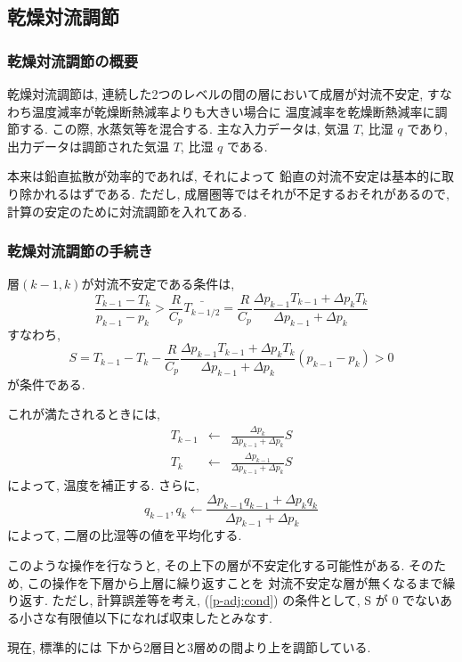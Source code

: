 ﻿
\subsection{乾燥対流調節}

\subsubsection{乾燥対流調節の概要}

乾燥対流調節は, 
連続した2つのレベルの間の層において成層が対流不安定, 
すなわち温度減率が乾燥断熱減率よりも大きい場合に
温度減率を乾燥断熱減率に調節する. この際, 水蒸気等を混合する.
主な入力データは, 気温 $T$, 比湿 $q$ であり,
出力データは調節された気温 $T$, 比湿 $q$ である.

本来は鉛直拡散が効率的であれば, それによって
鉛直の対流不安定は基本的に取り除かれるはずである.
ただし, 成層圏等ではそれが不足するおそれがあるので,
計算の安定のために対流調節を入れてある.

\subsubsection{乾燥対流調節の手続き}

層$(k-1,k)$が対流不安定である条件は,
%
\begin{equation}
\frac{T_{k-1} - T_{k}}{p_{k-1} - p_{k}} 
  > \frac{R}{C_p} \bar{T_{k-1/2}}
  = \frac{R}{C_p}
    \frac{\Delta p_{k-1} T_{k-1} + \Delta p_{k} T_{k}}
         {\Delta p_{k-1} + \Delta p_{k}} 
\end{equation}
%
すなわち,
\begin{equation}
 S = T_{k-1} - T_{k}
     - \frac{R}{C_p} 
        \frac{\Delta p_{k-1} T_{k-1} + \Delta p_{k} T_{k}}
         {\Delta p_{k-1} + \Delta p_{k}} 
       (p_{k-1} - p_{k})
   > 0 
  \label{p-adj:cond}
\end{equation}
が条件である.

これが満たされるときには,
\begin{eqnarray}
T_{k-1} & \leftarrow & \frac{\Delta p_{k}}{\Delta p_{k-1} + \Delta p_{k}} S \\
T_{k} & \leftarrow & \frac{\Delta p_{k-1}}{\Delta p_{k-1} + \Delta p_{k}} S 
\end{eqnarray}
によって, 温度を補正する.
さらに,
\begin{equation}
q_{k-1}, q_{k} \leftarrow
     \frac{\Delta p_{k-1} q_{k-1} + \Delta p_{k} q_{k}}
          {\Delta p_{k-1} + \Delta p_{k}} 
\end{equation}
によって, 二層の比湿等の値を平均化する.

このような操作を行なうと,
その上下の層が不安定化する可能性がある. そのため,
この操作を下層から上層に繰り返すことを
対流不安定な層が無くなるまで繰り返す.
ただし, 計算誤差等を考え, 
(\ref{p-adj:cond}) の条件として,
S が 0 でないある小さな有限値以下になれば収束したとみなす.

現在, 標準的には 下から2層目と3層めの間より上を調節している.


